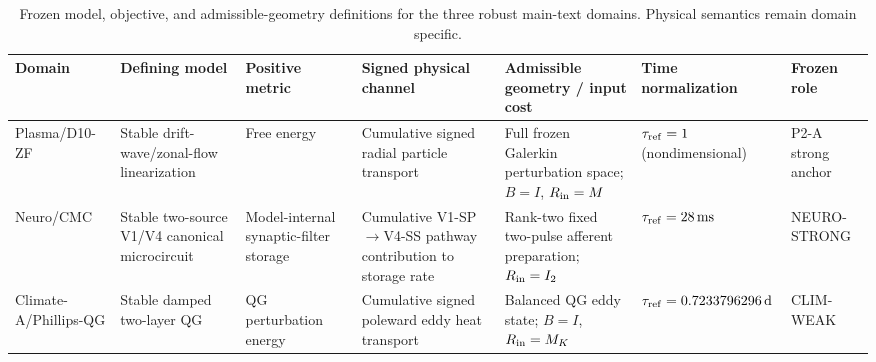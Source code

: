 \begin{table}[t]
\caption{Frozen model, objective, and admissible-geometry definitions for the three robust main-text domains. Physical semantics remain domain specific.}
\begin{tabular}{p{}p{}p{}p{}p{}p{}p{}}
\hline\hline
Domain & Defining model & Positive metric & Signed physical channel & Admissible geometry / input cost & Time normalization & Frozen role \\
\hline
Plasma/D10-ZF & Stable drift-wave/zonal-flow linearization & Free energy & Cumulative signed radial particle transport & Full frozen Galerkin perturbation space; $B=I$, $R_{\rm in}=M$ & $\tau_{\rm ref}=1$ (nondimensional) & P2-A strong anchor \\
Neuro/CMC & Stable two-source V1/V4 canonical microcircuit & Model-internal synaptic-filter storage & Cumulative V1-SP$\to$V4-SS pathway contribution to storage rate & Rank-two fixed two-pulse afferent preparation; $R_{\rm in}=I_2$ & $\tau_{\rm ref}=28\,\mathrm{ms}$ & NEURO-STRONG \\
Climate-A/Phillips-QG & Stable damped two-layer QG & QG perturbation energy & Cumulative signed poleward eddy heat transport & Balanced QG eddy state; $B=I$, $R_{\rm in}=M_K$ & $\tau_{\rm ref}=0.7233796296\,\mathrm d$ & CLIM-WEAK \\
\hline\hline
\end{tabular}
\end{table}
